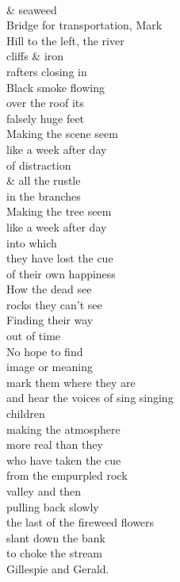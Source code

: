 \documentclass[smalldemyvopaper,11pt,twoside,onecolumn,openright,extrafontsizes]{memoir}
\begin{document}
\\\& seaweed
\\Bridge for transportation, Mark
\\Hill to the left, the river
\\cliffs \& iron
\\rafters closing in
\\Black smoke flowing
\\over the roof its
\\falsely huge feet
\\Making the scene seem
\\like a week after day
\\of distraction
\\\& all the rustle
\\in the branches
\\Making the tree seem
\\like a week after day
\\into which
\\they have lost the cue
\\of their own happiness
\\How the dead see
\\rocks they can't see
\\Finding their way
\\out of time
\\No hope to find
\\image or meaning
\\mark them where they are
\\and hear the voices of sing singing
\\children
\\making the atmosphere
\\more real than they
\\who have taken the cue
\\from the empurpled rock
\\valley and then
\\pulling back slowly
\\the last of the fireweed flowers
\\slant down the bank
\\to choke the stream
\\Gillespie and Gerald.
\end{document}
